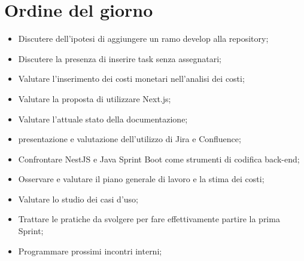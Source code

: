 

\section{Ordine del giorno}

\begin{itemize}
    \item Discutere dell'ipotesi di aggiungere un ramo develop alla repository;
    \item Discutere la presenza di inserire task senza assegnatari;
    \item Valutare l'inserimento dei costi monetari nell'analisi dei costi;
    \item Valutare la proposta di utilizzare Next.js;
    \item Valutare l'attuale stato della documentazione;
    \item presentazione e valutazione dell'utilizzo di Jira e Confluence;
    \item Confrontare NestJS e Java Sprint Boot come strumenti di codifica back-end;
    \item Osservare e valutare il piano generale di lavoro e la stima dei costi;
    \item Valutare lo studio dei casi d'uso;
    \item Trattare le pratiche da svolgere per fare effettivamente partire la prima Sprint;
    \item Programmare prossimi incontri interni;




\end{itemize}